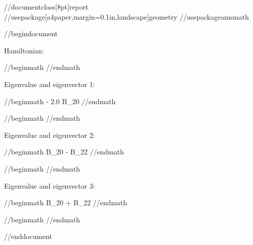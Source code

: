 //documentclass[8pt]{report}
//usepackage[a4paper,margin=0.1in,landscape]{geometry}
//usepackage{amsmath}

//begin{document}

Hamiltonian:

//begin{math}
\left[\begin{matrix}1.0 B_{20} & 0 & 1.0 B_{22}\\0 & - 2.0 B_{20} & 0\\1.0 B_{22} & 0 & 1.0 B_{20}\end{matrix}\right]
//end{math}

Eigenvalue and eigenvector 1:

//begin{math}
- 2.0 B_{20}
//end{math}

//begin{math}
\left[\begin{matrix}0\\1.0\\0\end{matrix}\right]
//end{math}

Eigenvalue and eigenvector 2:

//begin{math}
B_{20} - B_{22}
//end{math}

//begin{math}
\left[\begin{matrix}-1.0\\0\\1.0\end{matrix}\right]
//end{math}

Eigenvalue and eigenvector 3:

//begin{math}
B_{20} + B_{22}
//end{math}

//begin{math}
\left[\begin{matrix}1.0\\0\\1.0\end{matrix}\right]
//end{math}


//end{document}
